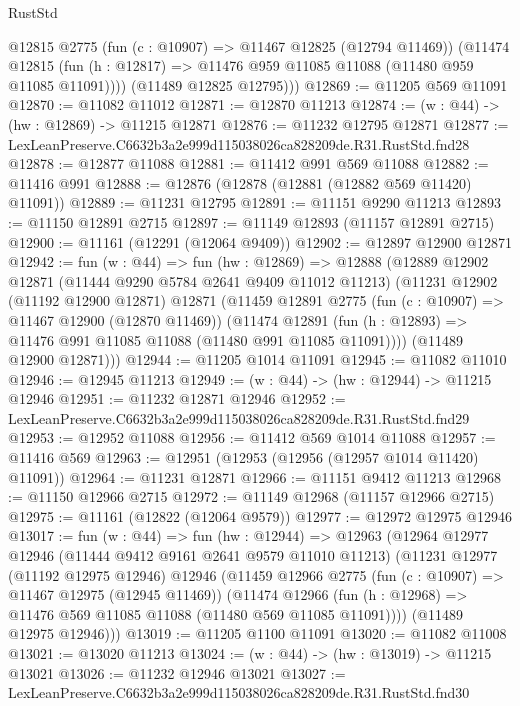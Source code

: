 \begin{lexlean}{RustStd}
\begin{coremodule}
          @12815
          @2775
          (fun (c : @10907) => @11467 @12825 (@12794 @11469))
          (@11474
            @12815
            (fun (h : @12817) => @11476 @959 @11085 @11088 (@11480 @959 @11085 @11091))))
        (@11489 @12825 @12795)))
@12869 := @11205 @569 @11091
@12870 := @11082 @11012
@12871 := @12870 @11213
@12874 := (w : @44) -> (hw : @12869) -> @11215 @12871
@12876 := @11232 @12795 @12871
@12877 := LexLeanPreserve.C6632b3a2e999d115038026ca828209de.R31.RustStd.fnd28
@12878 := @12877 @11088
@12881 := @11412 @991 @569 @11088
@12882 := @11416 @991
@12888 := @12876 (@12878 (@12881 (@12882 @569 @11420) @11091))
@12889 := @11231 @12795
@12891 := @11151 @9290 @11213
@12893 := @11150 @12891 @2715
@12897 := @11149 @12893 (@11157 @12891 @2715)
@12900 := @11161 (@12291 (@12064 @9409))
@12902 := @12897 @12900 @12871
@12942 := fun (w : @44) =>
  fun (hw : @12869) =>
  @12888
    (@12889
      @12902
      @12871
      (@11444 @9290 @5784 @2641 @9409 @11012 @11213)
      (@11231
        @12902
        (@11192 @12900 @12871)
        @12871
        (@11459
          @12891
          @2775
          (fun (c : @10907) => @11467 @12900 (@12870 @11469))
          (@11474
            @12891
            (fun (h : @12893) => @11476 @991 @11085 @11088 (@11480 @991 @11085 @11091))))
        (@11489 @12900 @12871)))
@12944 := @11205 @1014 @11091
@12945 := @11082 @11010
@12946 := @12945 @11213
@12949 := (w : @44) -> (hw : @12944) -> @11215 @12946
@12951 := @11232 @12871 @12946
@12952 := LexLeanPreserve.C6632b3a2e999d115038026ca828209de.R31.RustStd.fnd29
@12953 := @12952 @11088
@12956 := @11412 @569 @1014 @11088
@12957 := @11416 @569
@12963 := @12951 (@12953 (@12956 (@12957 @1014 @11420) @11091))
@12964 := @11231 @12871
@12966 := @11151 @9412 @11213
@12968 := @11150 @12966 @2715
@12972 := @11149 @12968 (@11157 @12966 @2715)
@12975 := @11161 (@12822 (@12064 @9579))
@12977 := @12972 @12975 @12946
@13017 := fun (w : @44) =>
  fun (hw : @12944) =>
  @12963
    (@12964
      @12977
      @12946
      (@11444 @9412 @9161 @2641 @9579 @11010 @11213)
      (@11231
        @12977
        (@11192 @12975 @12946)
        @12946
        (@11459
          @12966
          @2775
          (fun (c : @10907) => @11467 @12975 (@12945 @11469))
          (@11474
            @12966
            (fun (h : @12968) => @11476 @569 @11085 @11088 (@11480 @569 @11085 @11091))))
        (@11489 @12975 @12946)))
@13019 := @11205 @1100 @11091
@13020 := @11082 @11008
@13021 := @13020 @11213
@13024 := (w : @44) -> (hw : @13019) -> @11215 @13021
@13026 := @11232 @12946 @13021
@13027 := LexLeanPreserve.C6632b3a2e999d115038026ca828209de.R31.RustStd.fnd30

\end{coremodule}
\end{lexlean}
